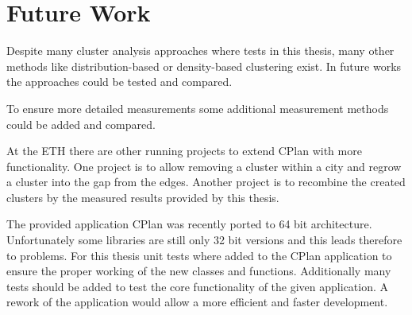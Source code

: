 \chapter{Future Work}
\label{sec:future_work}

Despite many cluster analysis approaches where tests in this thesis, many other methods like distribution-based or density-based clustering exist. In future works the approaches could be tested and compared. 

To ensure more detailed measurements some additional measurement methods could be added and compared.

At the ETH there are other running projects to extend CPlan with more functionality. One project is to allow removing a cluster within a city and regrow a cluster into the gap from the edges. Another project is to recombine the created clusters by the measured results provided by this thesis.

The provided application CPlan was recently ported to 64 bit architecture. Unfortunately some libraries are still only 32 bit versions and this leads therefore to problems. For this thesis unit tests where added to the CPlan application to ensure the proper working of the new classes and functions. Additionally many tests should be added to test the core functionality of the given application. A rework of the application would allow a more efficient and faster development.

